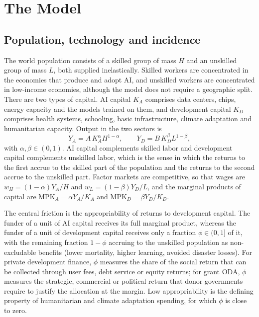 \documentclass[AER]{AEA}
\begin{document}
\section{The Model}

\subsection{Population, technology and incidence}

The world population consists of a skilled group of mass $H$ and an unskilled group of mass $L$, both supplied inelastically. Skilled workers are concentrated in the economies that produce and adopt AI, and unskilled workers are concentrated in low-income economies, although the model does not require a geographic split. There are two types of capital. AI capital $K_A$ comprises data centers, chips, energy capacity and the models trained on them, and development capital $K_D$ comprises health systems, schooling, basic infrastructure, climate adaptation and humanitarian capacity. Output in the two sectors is
\begin{equation}\label{eq:tech}
Y_A = A\,K_A^{\alpha}H^{1-\alpha}, \qquad Y_D = B\,K_D^{\beta}L^{1-\beta},
\end{equation}
with $\alpha,\beta\in(0,1)$. AI capital complements skilled labor and development capital complements unskilled labor, which is the sense in which the returns to the first accrue to the skilled part of the population and the returns to the second accrue to the unskilled part. Factor markets are competitive, so that wages are $w_H=(1-\alpha)Y_A/H$ and $w_L=(1-\beta)Y_D/L$, and the marginal products of capital are $\mathrm{MPK}_A=\alpha Y_A/K_A$ and $\mathrm{MPK}_D=\beta Y_D/K_D$.

The central friction is the appropriability of returns to development capital. The funder of a unit of AI capital receives its full marginal product, whereas the funder of a unit of development capital receives only a fraction $\phi\in(0,1]$ of it, with the remaining fraction $1-\phi$ accruing to the unskilled population as non-excludable benefits (lower mortality, higher learning, avoided disaster losses). For private development finance, $\phi$ measures the share of the social return that can be collected through user fees, debt service or equity returns; for grant ODA, $\phi$ measures the strategic, commercial or political return that donor governments require to justify the allocation at the margin. Low appropriability is the defining property of humanitarian and climate adaptation spending, for which $\phi$ is close to zero.
\end{document}

